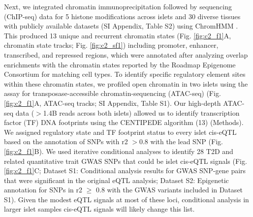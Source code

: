 Next, we integrated chromatin immunoprecipitation followed by sequencing (ChIP-seq) data for 5 histone modifications across islets \cite{parkerChromatinStretchEnhancer2013, scottGeneticRegulatorySignature2016} and 30 diverse tissues with publicly available datasets (SI Appendix, Table S2) \cite{consortiumIntegrativeAnalysis1112015, mikkelsenComparativeEpigenomicAnalysis2010, buenrostroTranspositionNativeChromatin2013} using ChromHMM \cite{ernstDiscoveryCharacterizationChromatin2010, ernstMappingAnalysisChromatin2011, ernstChromHMMAutomatingChromatin2012}. This produced 13 unique and recurrent chromatin states (Fig. \ref{fig:c2_f1}A, chromatin state tracks; Fig. \ref{fig:c2_sf1}) including promoter, enhancer, transcribed, and repressed regions, which were annotated after analyzing overlap enrichments with the chromatin states reported by the Roadmap Epigenome Consortium \cite{consortiumIntegrativeAnalysis1112015} for matching cell types. To identify specific regulatory element sites within these chromatin states, we profiled open chromatin in two islets using the assay for transposase-accessible chromatin-sequencing (ATAC-seq) \cite{pique-regiAccurateInferenceTranscription2011} (Fig. \ref{fig:c2_f1}A, ATAC-seq tracks; SI Appendix, Table S1). Our high-depth ATAC-seq data ($>$1.4B reads across both islets) allowed us to identify transcription factor (TF) DNA footprints using the CENTIPEDE algorithm (13) (Methods). We assigned regulatory state and TF footprint status to every islet cis-eQTL based on the annotation of SNPs with r2 $>$0.8 with the lead SNP (Fig. \ref{fig:c2_f1}B).  We used iterative conditional analyses \cite{scottGeneticRegulatorySignature2016} to identify 28 T2D and related quantitative trait GWAS SNPs that could be islet cis-eQTL signals (Fig. \ref{fig:c2_f1}C; Dataset S1: Conditional analysis results for GWAS SNP-gene pairs that were significant in the original eQTL analysis; Dataset S2: Epigenetic annotation for SNPs in r2 $\geq$ 0.8 with the GWAS variants included in Dataset S1). Given the modest eQTL signals at most of these loci, conditional analysis in larger islet samples cis-eQTL signals will likely change this list.

